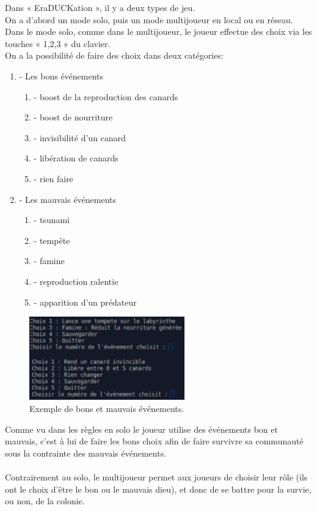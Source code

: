 \documentclass[12pt,a4paper,twoside]{article}
\begin{document}
Dans « EraDUCKation », il y a deux types de jeu.
\\
On a d'abord un mode solo, puis un mode multijoueur en local ou en réseau. 
\\
Dans le mode solo, comme dans le multijoueur, le joueur effectue des choix via les touches « 1,2,3 » du clavier.
\\
On a la possibilité de faire des choix dans deux catégories:
\begin{enumerate}
\item- Les bons événements
\begin{enumerate}
\item- boost de la reproduction des canards
\item- boost de nourriture
\item- invisibilité d'un canard
\item- libération de canards
\item- rien faire
\end{enumerate}
\item- Les mauvais événements
\begin{enumerate}
\item- tsunami
\item- tempête
\item- famine
\item- reproduction ralentie
\item- apparition d'un prédateur
\end{enumerate}
\end{enumerate}
\begin{figure}[h]
\centering
\includegraphics[width=0.6\textwidth]{event.png}
\caption{Exemple de bons et mauvais événements.}
\end{figure}
Comme vu dans les règles en solo le joueur utilise des événements bon et mauvais,
c'est à lui de faire les bons choix afin de faire survivre sa communauté sous la contrainte des mauvais événements.
\\ \\
Contrairement au solo, le multijoueur permet aux joueurs de choisir leur rôle (ils ont le choix d'être le bon ou le mauvais dieu), et donc de se battre pour la survie, ou non, de la colonie.
\end{document}
